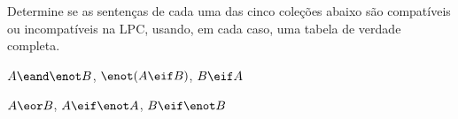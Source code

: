 \problempart
\label{pr.TT.satisfiable2}
Determine se as sentenças de cada uma das cinco coleções abaixo são compatíveis ou incompatíveis na LPC, usando, em cada caso, uma tabela de verdade completa.
\begin{earg}
\item $A \eand \enot B$, $\enot(A \eif B)$, $B \eif A$\vspace{.5ex} %


\item $A \eor B$, $A \eif \enot A$, $B \eif \enot B$ \vspace{.5ex}%



\end{earg}
